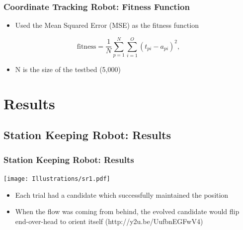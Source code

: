 \documentclass{beamer}
\begin{document}
\begin{frame}[fragile]
\frametitle{Coordinate Tracking Robot: Fitness Function}
\begin{itemize}
\item Used the Mean Squared Error (MSE) as the fitness function
\end{itemize}
  \[
  \textrm{fitness} = \frac{1}{N}\sum\limits_{p=1}^N\sum\limits_{i=1}^O (t_{pi} - a_{pi})^2,
\] 

\begin{itemize}
\item N is the size of the testbed (5,000) %
\end{itemize}
\end{frame}



\section{Results}
\subsection{Station Keeping Robot: Results} %
\begin{frame}
  \frametitle{Station Keeping Robot: Results}
  \begin{center}
  \texttt{[image: Illustrations/sr1.pdf]}
       \\
    \end{center}
  \begin{itemize}
    \item Each trial had a candidate which successfully maintained the position
        \item When the flow was coming from behind, the evolved candidate would flip end-over-head to orient itself (http://y2u.be/UufbnEGFwV4)
  \end{itemize}
\end{frame}
\end{document}
